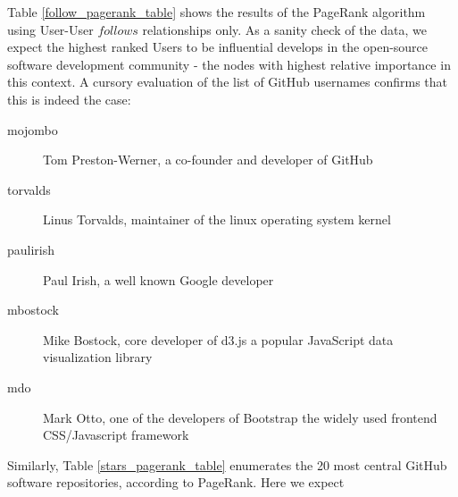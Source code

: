 Table \ref{follow_pagerank_table} shows the results of the PageRank algorithm using User-User $follows$ relationships only. As a sanity check of the data, we expect the highest ranked Users to be influential develops in the open-source software development community - the nodes with highest relative importance in this context. A cursory evaluation of the list of GitHub usernames confirms that this is indeed the case: 

\begin{description}
\item [mojombo] Tom Preston-Werner, a co-founder and developer of GitHub
\item [torvalds] Linus Torvalds, maintainer of the linux operating system kernel
\item [paulirish] Paul Irish, a well known Google developer
\item [mbostock] Mike Bostock, core developer of d3.js a popular JavaScript data visualization library
\item [mdo] Mark Otto, one of the developers of Bootstrap the widely used frontend CSS/Javascript framework
\end{description}

Similarly, Table \ref{stars_pagerank_table} enumerates the 20 most central GitHub software repositories, according to PageRank. Here we expect  

